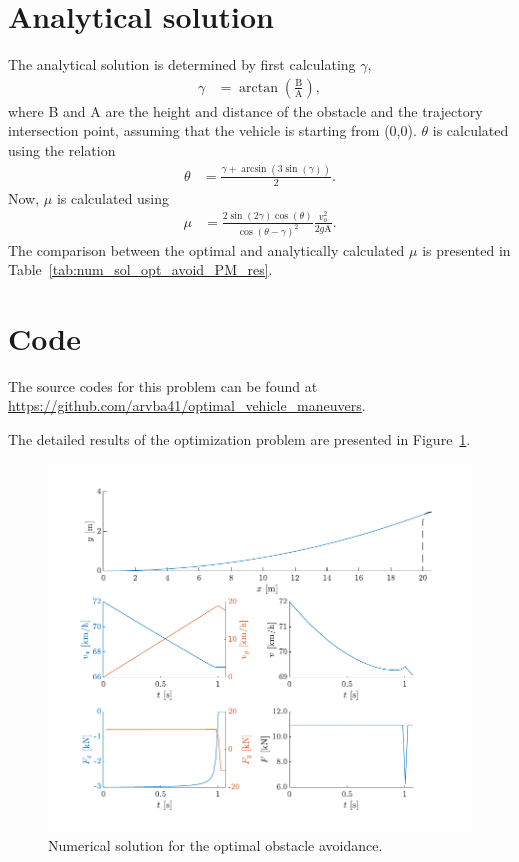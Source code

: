 \section{Analytical solution}
The analytical solution is determined by first calculating $\gamma$, 
\begin{align}
    \gamma &= \arctan\left(\frac{\text{B}}{\text{A}}\right),
\end{align}
where B and A are the height and distance of the obstacle and the trajectory intersection point, assuming that the vehicle is starting from (0,0). 
$\theta$ is calculated using the relation
\begin{align}
    \theta &= \frac{\gamma + \arcsin\left(3\sin\left(\gamma\right)\right)}{2}.
\end{align}
Now, $\mu$ is calculated using 
\begin{align}
    \mu &= \frac{2\sin\left(2\gamma\right)\cos\left(\theta\right)}{\cos\left(\theta-\gamma\right)^2}\frac{v_o^2}{2g\text{A}}.
\end{align}
The comparison between the optimal and analytically calculated $\mu$ is presented in Table~\ref{tab:num_sol_opt_avoid_PM_res}.

\section{Code}
The source codes for this problem can be found at \newline \href{https://github.com/arvba41/optimal_vehicle_maneuvers/blob/main/uppgift/ugf4/opti_veh_men_prt.m}{https://github.com/arvba41/optimal\_vehicle\_maneuvers}.

The detailed results of the optimization problem are presented in Figure~\ref{fig:num_sol_opt_avoid_PM_res_pic}.
\begin{figure}[h!]
    \centering
    \includegraphics{figures/prob4_opt_avoid_path.pdf}
    \caption{Numerical solution for the optimal obstacle avoidance.}
    \label{fig:num_sol_opt_avoid_PM_res_pic}
\end{figure}
